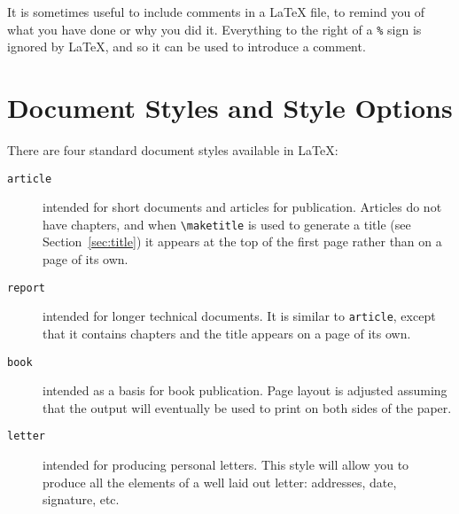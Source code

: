 It is sometimes useful to include comments in a \LaTeX{} file, to remind
you of what you have done or why you did it.  Everything to the
right of a \verb|%| sign is ignored by \LaTeX{}, and so it can
be used to introduce a comment.

\section{Document Styles and Style Options}\label{sec:styles}

There are four standard document styles available in \LaTeX:
\nobreak
\begin{description}

\item[{\tt article}]  intended for short documents and articles for publication.
Articles do not have chapters, and when \verb|\maketitle| is used to generate
a title (see Section~\ref{sec:title}) it appears at the top of the first page
rather than on a page of its own.

\item[{\tt report}] intended for longer technical documents.
It is similar to
{\tt article}, except that it contains chapters and the title appears on a page
of its own.

\item[{\tt book}] intended as a basis for book publication.  Page layout is
adjusted assuming that the output will eventually be used to print on
both sides of the paper.

\item[{\tt letter}]  intended for producing personal letters.  This style
will allow you to produce all the elements of a well laid out letter:
addresses, date, signature, etc.
\end{description}

